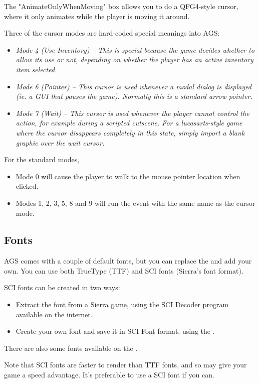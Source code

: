 The "AnimateOnlyWhenMoving" box allows you to do a QFG4-style cursor, where it only
animates while the player is moving it around.

Three of the cursor modes are hard-coded special meanings into AGS:
\begin{itemize}
\item \it{Mode 4 (Use Inventory)} -- This is special because the game decides whether to
allow its use or not, depending on whether the player has an active inventory item
selected.
\item \it{Mode 6 (Pointer)} -- This cursor is used whenever a modal dialog is displayed
(ie. a GUI that pauses the game). Normally this is a standard arrow pointer.
\item \it{Mode 7 (Wait)} -- This cursor is used whenever the player cannot control the
action, for example during a scripted cutscene. For a lucasarts-style game where the cursor
disappears completely in this state, simply import a blank graphic over the wait cursor.
\end{itemize}

For the standard modes,
\begin{itemize}
\item Mode 0 will cause the player to walk to the mouse pointer location when clicked.
\item Modes 1, 2, 3, 5, 8 and 9 will run the event with the same name as the cursor mode.
\end{itemize}


\subsection{Fonts}%

AGS comes with a couple of default fonts, but you can replace the and add your own.
You can use both TrueType (TTF) and SCI fonts (Sierra's font format).

SCI fonts can be created in two ways:
\begin{itemize}
\item Extract the font from a Sierra game, using the SCI Decoder program
available on the internet.
\item Create your own font and save it in SCI Font format, using the
.
\end{itemize}
There are also some fonts available on the
.

Note that SCI fonts are faster to render than TTF fonts, and so may give your game
a speed advantage. It's preferable to use a SCI font if you can.

